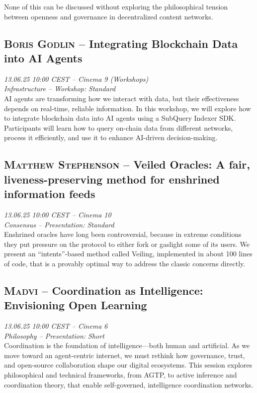 None of this can be discussed without  exploring the philosophical tension between openness and governance in decentralized content networks.

\clearpage
\subsection {\textsc{Boris Godlin}  -- Integrating Blockchain Data into AI Agents} \noindent \textit {13.06.25 10:00 CEST -- Cinema 9 (Workshops)\\ Infrastructure -- Workshop: Standard}\\[1em] AI agents are transforming how we interact with data, but their effectiveness depends on real-time, reliable information. In this workshop, we will explore how to integrate blockchain data into AI agents using a SubQuery Indexer SDK. Participants will learn how to query on-chain data from different networks, process it efficiently, and use it to enhance AI-driven decision-making.

\clearpage
\subsection {\textsc{Matthew Stephenson}  -- Veiled Oracles: A fair, liveness-preserving method for enshrined information feeds} \noindent \textit {13.06.25 10:00 CEST -- Cinema 10\\ Consensus -- Presentation: Standard}\\[1em] Enshrined oracles have long been controversial, because in extreme conditions they put pressure on the protocol to either fork or gaslight some of its users. We present an ``intents''-based method called Veiling, implemented in about 100 lines of code, that is a provably optimal way to address the classic concerns directly.

\clearpage
\subsection {\textsc{Madvi}  -- Coordination as Intelligence: Envisioning Open Learning} \noindent \textit {13.06.25 10:00 CEST -- Cinema 6\\ Philosophy -- Presentation: Short}\\[1em] Coordination is the foundation of intelligence—both human and artificial. As we move toward an agent-centric internet, we must rethink how governance, trust, and open-source collaboration shape our digital ecosystems. This session explores philosophical and technical frameworks, from AGTP, to active inference and coordination theory, that enable self-governed, intelligence coordination networks.

